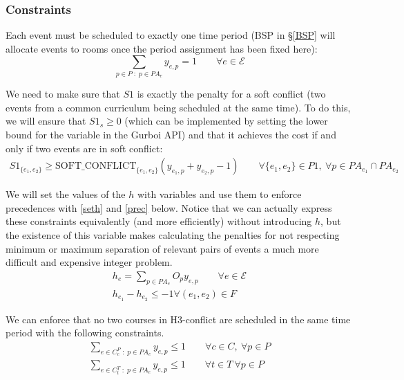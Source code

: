 \documentclass{article}
\newcommand{\E}{\mathcal{E}}
\begin{document}
\subsubsection*{Constraints}
Each event must be scheduled to exactly one time period (BSP in \S\ref{BSP} will
allocate events to rooms once the period assignment has been fixed here):
\begin{equation}
    \sum_{p \in P \; : \; p \in PA_e} y_{e,p} = 1 \qquad \forall e \in \E
\end{equation}

We need to make sure that $S1$ is exactly the penalty for a soft conflict (two
events from a common curriculum being scheduled at the same time). To do this,
we will ensure that $S1_s \geq 0$ (which can be implemented by setting the lower
bound for the variable in the Gurboi API) and that it achieves the cost if and
only if two events are in soft conflict:
\begin{gather} \label{setS1}
    S1_{\{e_1, e_2\}} \geq \text{SOFT\_CONFLICT}_{\{e_1, e_2\}}
        (y_{e_1, p} + y_{e_2, p} - 1) \qquad \forall \{e_1, e_2\} \in P1, \
        \forall p \in PA_{e_1} \cap PA_{e_2}
\end{gather}

We will set the values of the $h$ with variables and use them to enforce
precedences with \eqref{seth} and \eqref{prec} below. Notice that we can
actually express these constraints equivalently (and more efficiently) without
introducing $h$, but the existence of this variable makes calculating the
penalties for not respecting minimum or maximum separation of relevant pairs of
events a much more difficult and expensive integer problem.
\begin{gather}
    h_e = \sum_{p \in PA_e} O_p y_{e, p} \qquad \forall e \in \E \label{seth} \\
    h_{e_1} - h_{e_2} \leq -1 \forall (e_1, e_2) \in F \label{prec}
\end{gather}

We can enforce that no two courses in H3-conflict are scheduled in the same time
period with the following constraints.
\begin{gather}
    \sum_{e \in C^P_c \; : \; p \in PA_e} y_{e,p} \leq 1
        \qquad \forall c \in C, \ \forall p \in P \\
    \sum_{e \in C^T_t \; : \; p \in PA_e} y_{e, p} \leq 1
        \qquad \forall t \in T \ \forall p \in P
\end{gather}
\end{document}
